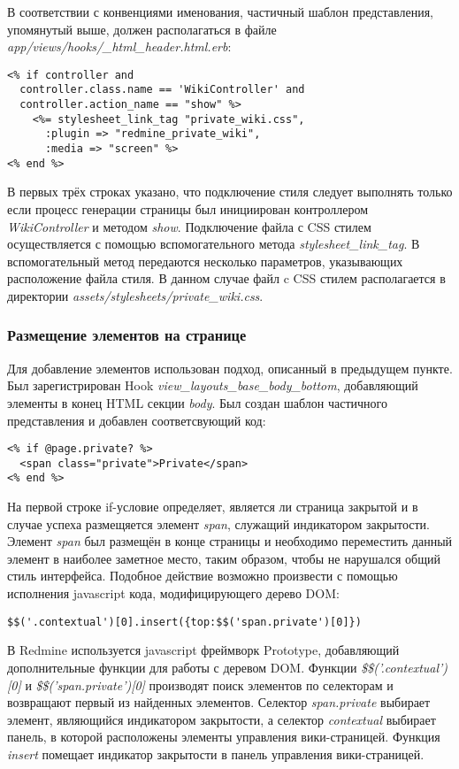 В соответствии с конвенциями именования, частичный шаблон представления,
упомянутый выше, должен располагаться в файле
\textit{app/views/hooks/\_html\_header.html.erb}:
\small{\begin{lstlisting}
<% if controller and
  controller.class.name == 'WikiController' and
  controller.action_name == "show" %>
    <%= stylesheet_link_tag "private_wiki.css",
      :plugin => "redmine_private_wiki",
      :media => "screen" %>
<% end %>
\end{lstlisting}}
В первых трёх строках указано, что подключение стиля следует выполнять только
если процесс генерации страницы был инициирован контроллером
\textit{WikiController} и методом \textit{show}. Подключение файла с CSS стилем
осуществляется с помощью вспомогательного метода
\textit{stylesheet\_link\_tag}. В вспомогательный метод передаются несколько
параметров, указывающих расположение файла стиля. В данном случае файл c CSS
стилем располагается в директории
\textit{assets/stylesheets/private\_wiki.css}.

\subsubsection{Размещение элементов на странице}
Для добавление элементов использован подход, описанный в предыдущем пункте. Был
зарегистрирован Hook \textit{view\_layouts\_base\_body\_bottom}, добавляющий
элементы в конец HTML секции \textit{body}. Был создан шаблон частичного
представления и добавлен соответсвующий код:
\small{\begin{lstlisting}
<% if @page.private? %>
  <span class="private">Private</span>
<% end %>
\end{lstlisting}}
На первой строке if-условие определяет, является ли страница закрытой и в
случае успеха размещяется элемент \textit{span}, служащий индикатором
закрытости. Элемент \textit{span} был размещён в конце страницы и необходимо
переместить данный элемент в наиболее заметное место, таким образом, чтобы не
нарушался общий стиль интерфейса. Подобное действие возможно произвести с
помощью исполнения javascript кода, модифицирующего дерево DOM:
\small{\begin{lstlisting}
$$('.contextual')[0].insert({top:$$('span.private')[0]})
\end{lstlisting}}
В Redmine используется javascript фреймворк Prototype, добавляющий
дополнительные функции для работы с деревом DOM. Функции
\textit{\$\$('.contextual')[0]} и \textit{\$\$('span.private')[0]} производят
поиск элементов по селекторам и возвращают первый из найденных элементов.
Селектор \textit{span.private} выбирает элемент, являющийся индикатором
закрытости, а селектор \textit{contextual} выбирает панель, в которой
расположены элементы управления вики-страницей. Функция \textit{insert}
помещает индикатор закрытости в панель управления вики-страницей.

